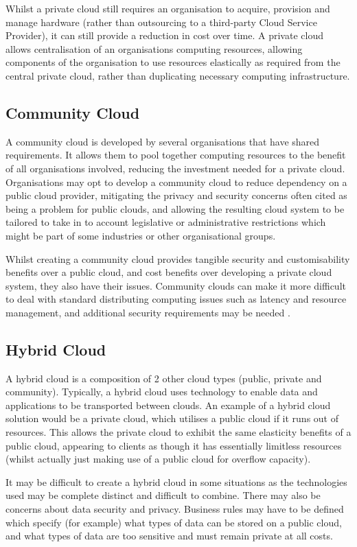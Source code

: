 Whilst a private cloud still requires an organisation to acquire, provision and manage hardware (rather than outsourcing to a third-party Cloud Service Provider), it can still provide a reduction in cost over time. A private cloud allows centralisation of an organisations computing resources, allowing components of the organisation to use resources elastically as required from the central private cloud, rather than duplicating necessary computing infrastructure.

\subsection{Community Cloud}
A community cloud is developed by several organisations that have shared requirements. It allows them to pool together computing resources to the benefit of all organisations involved, reducing the investment needed for a private cloud. Organisations may opt to develop a community cloud to reduce dependency on a public cloud provider, mitigating the privacy and security concerns often cited as being a problem for public clouds, and allowing the resulting cloud system to be tailored to take in to account legislative or administrative restrictions which might be part of some industries or other organisational groups.

Whilst creating a community cloud provides tangible security and customisability benefits over a public cloud, and cost benefits over developing a private cloud system, they also have their issues. Community clouds can make it more difficult to deal with standard distributing computing issues such as latency and resource management, and additional security requirements may be needed \cite{briscoe2009digital}. 

\subsection{Hybrid Cloud}
A hybrid cloud is a composition of 2 other cloud types (public, private and community). Typically, a hybrid cloud uses technology to enable data and applications to be transported between clouds. An example of a hybrid cloud solution would be a private cloud, which utilises a public cloud if it runs out of resources. This allows the private cloud to exhibit the same elasticity benefits of a public cloud, appearing to clients as though it has essentially limitless resources (whilst actually just making use of a public cloud for overflow capacity).

It may be difficult to create a hybrid cloud in some situations as the technologies used may be complete distinct and difficult to combine. There may also be concerns about data security and privacy. Business rules may have to be defined which specify (for example) what types of data can be stored on a public cloud, and what types of data are too sensitive and must remain private at all costs. 

